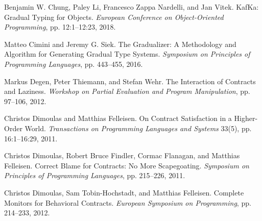 \documentclass[screen=true, 10pt, acmsmall]{acmart}
\newenvironment{SingleColumn}{\begin{list}{}{\topsep=0pt\partopsep=0pt%
\listparindent=0pt\itemindent=0pt\labelwidth=0pt\leftmargin=0pt\rightmargin=0pt%
\itemsep=0pt\parsep=0pt}\item}{\end{list}}
\newenvironment{AutoBibliography}{\begin{small}}{\end{small}}
\newcommand{\Autobibentry}[1]{\hspace{0.05\linewidth}\parbox[t]{0.95\linewidth}{\parindent=-0.05\linewidth#1\vspace{1.0ex}}}
\begin{document}
\begin{AutoBibliography}
\begin{SingleColumn}
\label{t:x28autobib_x22Benjamin_Wx2e_Chungx2c_Paley_Lix2c_Francesco_Zappa_Nardellix2c_and_Jan_VitekA_Framework_for_Objectx2dOriented_Gradual_TypingTo_appear_in_European_Conference_on_Objectx2dOriented_Programming2018x22x29}\Autobibentry{Benjamin W. Chung, Paley Li, Francesco Zappa Nardelli, and Jan Vitek. KafKa: Gradual Typing for Objects. \textit{European Conference on Object{-}Oriented Programming}, pp. 12:1{--}12:23, 2018.}

\label{t:x28autobib_x22Matteo_Cimini_and_Jeremy_Gx2e_SiekThe_Gradualizerx3a_A_Methodology_and_Algorithm_for_Generating_Gradual_Type_SystemsSymposium_on_Principles_of_Programming_Languagesx2c_ppx2e_443x2dx2d4552016x22x29}\Autobibentry{Matteo Cimini and Jeremy G. Siek. The Gradualizer: A Methodology and Algorithm for Generating Gradual Type Systems. \textit{Symposium on Principles of Programming Languages}, pp. 443{--}455, 2016.}

\label{t:x28autobib_x22Markus_Degenx2c_Peter_Thiemannx2c_and_Stefan_WehrThe_Interaction_of_Contracts_and_LazinessWorkshop_on_Partial_Evaluation_and_Program_Manipulationx2c_ppx2e_97x2dx2d1062012x22x29}\Autobibentry{Markus Degen, Peter Thiemann, and Stefan Wehr. The Interaction of Contracts and Laziness. \textit{Workshop on Partial Evaluation and Program Manipulation}, pp. 97{--}106, 2012.}

\label{t:x28autobib_x22Christos_Dimoulas_and_Matthias_FelleisenOn_Contract_Satisfaction_in_a_Higherx2dOrder_WorldTransactions_on_Programming_Languages_and_Systems_33x285x29x2c_ppx2e_16x3a1x2dx2d16x3a292011x22x29}\Autobibentry{Christos Dimoulas and Matthias Felleisen. On Contract Satisfaction in a Higher{-}Order World. \textit{Transactions on Programming Languages and Systems} 33(5), pp. 16:1{--}16:29, 2011.}

\label{t:x28autobib_x22Christos_Dimoulasx2c_Robert_Bruce_Findlerx2c_Cormac_Flanaganx2c_and_Matthias_FelleisenCorrect_Blame_for_Contractsx3a_No_More_ScapegoatingSymposium_on_Principles_of_Programming_Languagesx2c_ppx2e_215x2dx2d2262011x22x29}\Autobibentry{Christos Dimoulas, Robert Bruce Findler, Cormac Flanagan, and Matthias Felleisen. Correct Blame for Contracts: No More Scapegoating. \textit{Symposium on Principles of Programming Languages}, pp. 215{--}226, 2011.}

\label{t:x28autobib_x22Christos_Dimoulasx2c_Sam_Tobinx2dHochstadtx2c_and_Matthias_FelleisenComplete_Monitors_for_Behavioral_ContractsEuropean_Symposium_on_Programmingx2c_ppx2e_214x2dx2d2332012x22x29}\Autobibentry{Christos Dimoulas, Sam Tobin{-}Hochstadt, and Matthias Felleisen. Complete Monitors for Behavioral Contracts. \textit{European Symposium on Programming}, pp. 214{--}233, 2012.}


\end{SingleColumn}
\end{AutoBibliography}
\end{document}

